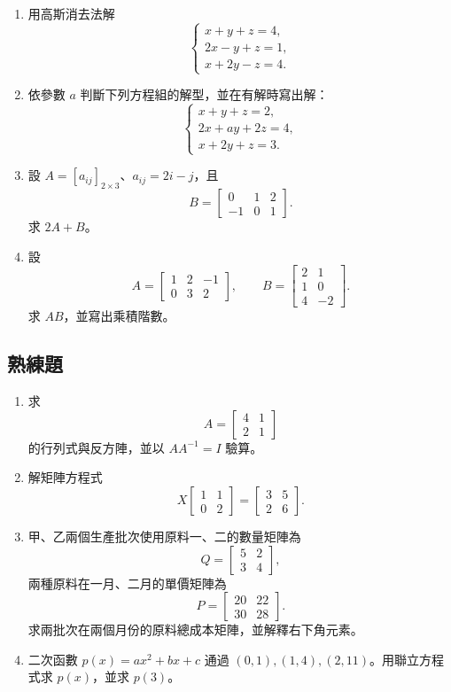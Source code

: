 \documentclass[11pt,a4paper]{article}
\begin{document}
\begin{enumerate}
\def\labelenumi{\arabic{enumi}.}
\item
  用高斯消去法解
  \[
  \begin{cases}
  x+y+z=4,\\
  2x-y+z=1,\\
  x+2y-z=4.
  \end{cases}
  \]
\item
  依參數 \(a\) 判斷下列方程組的解型，並在有解時寫出解：
  \[
  \begin{cases}
  x+y+z=2,\\
  2x+ay+2z=4,\\
  x+2y+z=3.
  \end{cases}
  \]
\item
  設 \(A=[a_{ij}]_{2\times3}\)、\(a_{ij}=2i-j\)，且
  \[
  B=\begin{bmatrix}0&1&2\\-1&0&1\end{bmatrix}.
  \]
  求 \(2A+B\)。
\item
  設
  \[
  A=\begin{bmatrix}1&2&-1\\0&3&2\end{bmatrix},
  \qquad
  B=\begin{bmatrix}2&1\\1&0\\4&-2\end{bmatrix}.
  \]
  求 \(AB\)，並寫出乘積階數。
\end{enumerate}

\subsection{熟練題}\label{ux719fux7df4ux984c}

\begin{enumerate}
\def\labelenumi{\arabic{enumi}.}
\setcounter{enumi}{4}
\item
  求
  \[
  A=\begin{bmatrix}4&1\\2&1\end{bmatrix}
  \]
  的行列式與反方陣，並以 \(AA^{-1}=I\) 驗算。
\item
  解矩陣方程式
  \[
  X\begin{bmatrix}1&1\\0&2\end{bmatrix}
  =
  \begin{bmatrix}3&5\\2&6\end{bmatrix}.
  \]
\item
  甲、乙兩個生產批次使用原料一、二的數量矩陣為
  \[
  Q=\begin{bmatrix}5&2\\3&4\end{bmatrix},
  \]
  兩種原料在一月、二月的單價矩陣為
  \[
  P=\begin{bmatrix}20&22\\30&28\end{bmatrix}.
  \]
  求兩批次在兩個月份的原料總成本矩陣，並解釋右下角元素。
\item
  二次函數 \(p(x)=ax^2+bx+c\) 通過 \((0,1),(1,4),(2,11)\)。用聯立方程式求 \(p(x)\)，並求 \(p(3)\)。
\end{enumerate}
\end{document}
